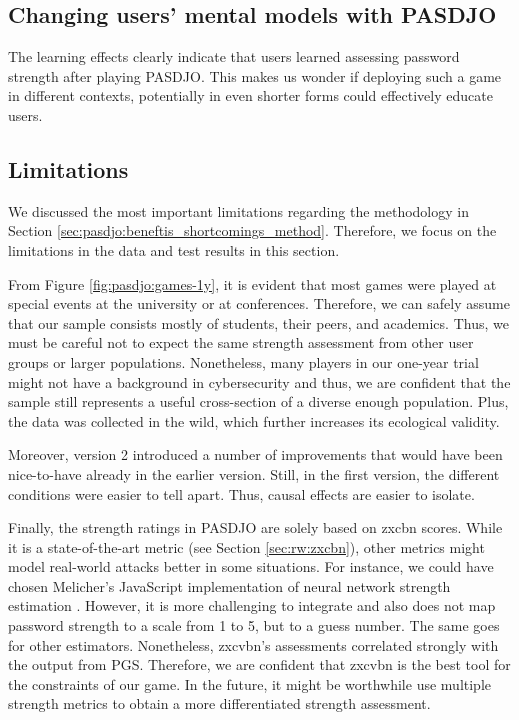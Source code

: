 \subsection{Changing users' mental models with PASDJO}
The learning effects clearly indicate that users learned assessing password strength after playing PASDJO. This makes us wonder if deploying such a game in different contexts, potentially in even shorter forms could effectively educate users. 

\subsection{Limitations}
We discussed the most important limitations regarding the methodology in Section \ref{sec:pasdjo:beneftis_shortcomings_method}. Therefore, we focus on the limitations in the data and test results in this section. 

From Figure \ref{fig:pasdjo:games-1y}, it is evident that most games were played at special events at the university or at conferences. Therefore, we can safely assume that our sample consists mostly of students, their peers, and academics. Thus, we must be careful not to expect the same strength assessment from other user groups or larger populations. Nonetheless, many players in our one-year trial might not have a background in cybersecurity and thus, we are confident that the sample still represents a useful cross-section of a diverse enough population. Plus, the data was collected in the wild, which further increases its ecological validity. 

Moreover, version 2 introduced a number of improvements that would have been nice-to-have already in the earlier version. Still, in the first version, the different conditions were easier to tell apart. Thus, causal effects are easier to isolate. 

Finally, the strength ratings in PASDJO are solely based on zxcbn scores. While it is a state-of-the-art metric (see Section \ref{sec:rw:zxcbn}), other metrics might model real-world attacks better in some situations. For instance, we could have chosen Melicher's JavaScript implementation of neural network strength estimation \cite{Melicher2016NeuralNetworks}. However, it is more challenging to integrate and also does not map password strength to a scale from 1 to 5, but to a guess number. The same goes for other estimators. Nonetheless, zxcvbn's assessments correlated strongly with the output from \gls{PGS}. Therefore, we are confident that zxcvbn is the best tool for the constraints of our game. In the future, it might be worthwhile use multiple strength metrics to obtain a more differentiated strength assessment.

